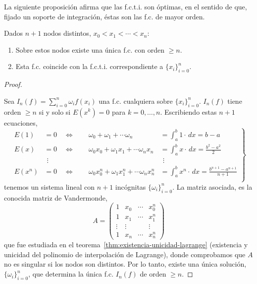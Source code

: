 La siguiente proposición afirma que las f.c.t.i. son óptimas, en el
sentido de que, fijado un soporte de integración, éstas son las f.c.
de mayor orden.
\begin{proposition}
  \label{pro:existencia.fcti}
  Dados $n+1$ nodos distintos, $x_0<x_1<\cdots<x_n$:
  \begin{enumerate}
  \item Sobre estos nodos existe una única f.c. con orden $\ge
    n$.
  \item Esta f.c. coincide con la f.c.t.i. correspondiente a
    $\{x_i\}_{i=0}^n$.
  \end{enumerate}
\end{proposition}
\begin{proof}~\par
   Sea $I_n(f)=\sum_{i=0}^n \omega_i f(x_i)$ una
  f.c. cualquiera sobre $\{x_i\}_{i=0}^n$. $I_n(f)$ tiene orden $\ge
  n$ si y solo si $E(x^k)=0$ para $k=0,\dots,n$. Escribiendo estas $n+1$
  ecuaciones,
  \begin{equation}
    \left.
  \begin{alignedat}{2} %
    E(1)&=0 \quad \Leftrightarrow\ \quad &
    \omega_0 + \omega_1 + \cdots \omega_n &=
    \int_a^b 1\cdot\,dx = b-a
    \\
    E(x)&=0 \quad \Leftrightarrow\ \quad &
    \omega_0 x_0 + \omega_1 x_1 + \cdots \omega_n x_n &=
    \int_a^b x \cdot\,dx = \frac{b^2-a^2}{2}
    \\
    &\ \, \vdots & &\ \, \vdots
    \\
    E(x^n)&=0 \quad \Leftrightarrow\ \quad &
    \omega_0 x_0^n + \omega_1 x_1^n + \cdots \omega_n x_n^n &=
    \int_a^b x^n \cdot\,dx = \frac{b^{n+1}-a^{n+1}}{n+1}
    \\
  \end{alignedat}
  \right\}
  \label{eq:sl.fcti}
\end{equation}
  tenemos un sistema lineal con $n+1$ incógnitas
  $\{\omega_i\}_{i=0}^n$. La matriz asociada, es la conocida matriz de
  Vandermonde,
  \begin{equation*}
    A =
    \begin{pmatrix}
      1 & x_0& \cdots & x_0^n \\
      1 & x_1& \cdots & x_1^n \\
      \vdots & \vdots & & \vdots \\
      1 & x_n& \cdots & x_n^n
    \end{pmatrix}
  \end{equation*}
  que fue estudiada en el teorema~\ref{thm:existencia-unicidad-lagrange}
  (existencia y unicidad del polinomio de interpolación de Lagrange),
  donde comprobamos que $A$ no es singular si los nodos son distintos.
  Por lo tanto, existe una única solución, $\{\omega_i\}_{i=0}^n$, que
  determina la única f.c. $I_n(f)$ de orden $\ge n$.


\end{proof}
